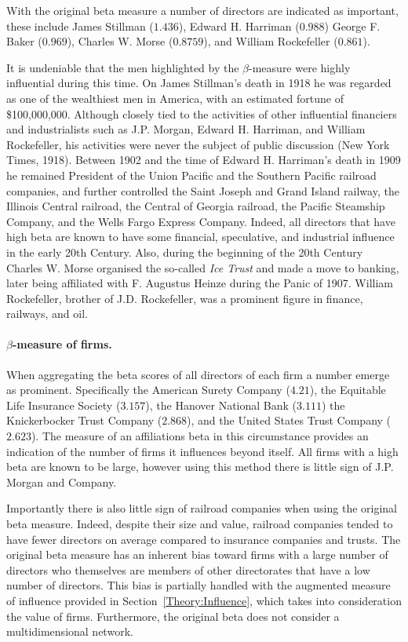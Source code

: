 With the original beta measure a number of directors are indicated as important, these include James Stillman ($1.436$), Edward H. Harriman ($0.988$) George F. Baker ($0.969$), Charles W. Morse ($0.8759$), and William Rockefeller ($0.861$).

It is undeniable that the men highlighted by the $\beta$-measure were highly influential during this time. On James Stillman's death in 1918 he was regarded as one of the wealthiest men in America, with an estimated fortune of \$100,000,000. Although closely tied to the activities of other influential financiers and industrialists such as J.P. Morgan, Edward H. Harriman, and William Rockefeller, his activities were never the subject of public discussion (New York Times, 1918). Between 1902 and the time of Edward H. Harriman's death in 1909 he remained President of the Union Pacific and the Southern Pacific railroad companies, and further controlled the Saint Joseph and Grand Island railway, the Illinois Central railroad, the Central of Georgia railroad, the Pacific Steamship Company, and the Wells Fargo Express Company. Indeed, all directors that have high beta are known to have some financial, speculative, and industrial influence in the early 20th Century. Also, during the beginning of the 20th Century Charles W. Morse organised the so-called \emph{Ice Trust} and made a move to banking, later being affiliated with F. Augustus Heinze during the Panic of 1907. William Rockefeller, brother of J.D. Rockefeller, was a prominent figure in finance, railways, and oil.

\paragraph{$\beta$-measure of firms.}

When aggregating the beta scores of all directors of each firm a number emerge as prominent. Specifically the American Surety Company ($4.21$), the Equitable Life Insurance Society ($3.157$), the Hanover National Bank ($3.111$) the Knickerbocker Trust Company ($2.868$), and the United States Trust Company ($2.623$). The measure of an affiliations beta in this circumstance provides an indication of the number of firms it influences beyond itself. All firms with a high beta are known to be large, however using this method there is little sign of J.P. Morgan and Company.

Importantly there is also little sign of railroad companies when using the original beta measure. Indeed, despite their size and value, railroad companies tended to have fewer directors on average compared to insurance companies and trusts. The original beta measure has an inherent bias toward firms with a large number of directors who themselves are members of other directorates that have a low number of directors. This bias is partially handled with the augmented measure of influence provided in Section~\ref{Theory:Influence}, which takes into consideration the value of firms. Furthermore, the original beta does not consider a multidimensional network.

